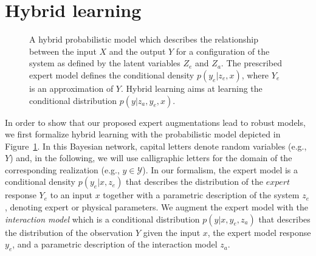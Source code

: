 \documentclass{article}
\newcommand\figref{Figure~\ref}
\begin{document}
\section{Hybrid learning}
\begin{figure}
    \centering
    \caption{A hybrid probabilistic model which describes the relationship between the input $X$ and the output $Y$ for a configuration of the system as defined by the latent variables $Z_e$ and $Z_a$. The prescribed expert model defines the conditional density $p(y_e|z_e, x)$, where $Y_e$ is an approximation of $Y$. Hybrid learning aims at learning the conditional distribution $p(y|z_a, y_e, x)$.}
    \label{fig:gen_bnet}
    \vspace{-1em}
\end{figure}

In order to show that our proposed expert augmentations lead to robust models, we first formalize hybrid learning with the probabilistic model depicted in \figref{fig:gen_bnet}. In this Bayesian network, capital letters denote random variables (e.g., $Y$) and, in the following, we will use calligraphic letters for the domain of the corresponding realization (e.g., $y \in \mathcal{Y}$). In our formalism, the expert model is a conditional density $p(y_e|x, z_e)$ that describes the distribution of the $expert$ response $Y_e$ to an input $x$ together with a parametric description of the system $z_e$, denoting expert or physical parameters. We augment the expert model with the \textit{interaction model} which is a conditional distribution $p(y|x, y_e, z_a)$ that describes the distribution of the observation $Y$ given the input $x$, the expert model response $y_e$, and a parametric description of the interaction model $z_a$.
\end{document}
